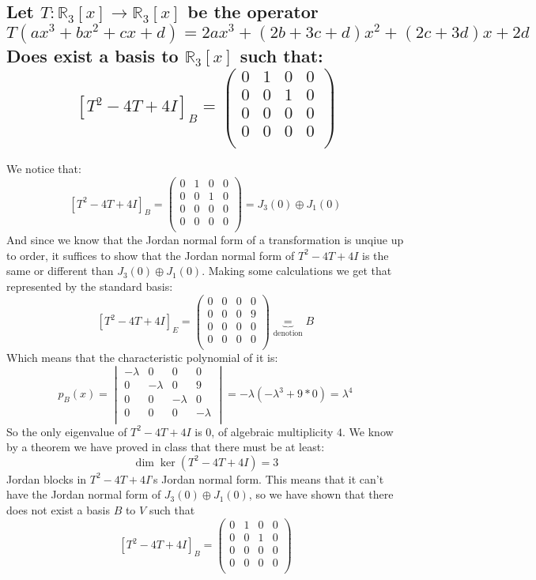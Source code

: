 \documentclass[11pt,a4paper]{article}
\theoremstyle{plain}
\newcommand{\R}{\mathbb{R}}
\begin{document}
	\subsection{Let $T\colon \R_3[x]\to\R_3[x]$ be the operator 
	\[
	T(ax^3+bx^2+cx+d) = 2ax^3+(2b+3c+d)x^2+(2c+3d)x+2d
	\]
	Does exist a basis to $\R_3[x]$ such that: 
	\[ 
	[T^2-4T+4I]_B = 
	\begin{pmatrix}
	0 & 1 & 0 & 0\\
	0 & 0 & 1 & 0\\
	0 & 0 & 0 & 0\\
	0 & 0 & 0 & 0\\
	\end{pmatrix} \]}
	We notice that:
	\[ [T^2-4T+4I]_B = 
	\begin{pmatrix}
	0 & 1 & 0 & 0\\
	0 & 0 & 1 & 0\\
	0 & 0 & 0 & 0\\
	0 & 0 & 0 & 0\\
	\end{pmatrix}    = J_3(0) \oplus J_1(0) \]
	And since we know that the Jordan normal form of a transformation
	is unqiue up to order, it suffices to show that the Jordan normal form
	of $T^2-4T+4I$ is the same or different than $J_3(0) \oplus J_1(0)$.
	Making some calculations we get that represented by the standard
	basis:
	\[
		[T^2-4T+4I]_E = 
		\begin{pmatrix}
		0 & 0 & 0 & 0\\
		0 & 0 & 0 & 9\\
		0 & 0 & 0 & 0\\
		0 & 0 & 0 & 0\\
		\end{pmatrix} \underbrace{=}_{\text{denotion}} B 
	\]
	Which means that the characteristic polynomial of it is:
	\[
		p_{B}(x) = 
		\begin{vmatrix}
	-\lambda & 0 & 0 & 0\\
	0 & -\lambda & 0 & 9\\
	0 & 0 & -\lambda & 0\\
	0 & 0 & 0 & -\lambda\\
		\end{vmatrix} = 
		-\lambda(-\lambda^3+9*0) =
		\lambda^4
	\]
	So the only eigenvalue of $T^2-4T+4I$ is $0$, of algebraic multiplicity $4$.
	We know by a theorem we have proved in class that there must be at least:
	\[\dim\ker(T^2-4T+4I) = 3\]
	Jordan blocks in $T^2-4T+4I$'s Jordan normal form. This means that it
	can't have the Jordan normal form of $J_3(0) \oplus J_1(0)$, so we have
	shown that there does not exist a basis $B$ to $V$ such that 
	\[[T^2-4T+4I]_B = 
	\begin{pmatrix}
	0 & 1 & 0 & 0\\
	0 & 0 & 1 & 0\\
	0 & 0 & 0 & 0\\
	0 & 0 & 0 & 0\\
	\end{pmatrix}\]
\end{document}
